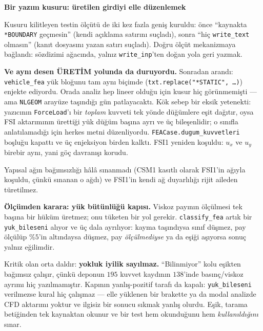 \documentclass[11pt,a4paper]{article}
\newcommand{\kkkenar}{lacivert}
\newcommand{\kkzemin}{kod}
\newenvironment{renkkutu}[3]{%
  \renewcommand{\kkkenar}{#1}\renewcommand{\kkzemin}{#2}%
  \par\medskip\noindent
  \begin{lrbox}{\kutugovde}%
  \begin{minipage}{\dimexpr\linewidth-2\fboxsep-2\fboxrule\relax}\footnotesize
  \textcolor{#1}{\textbf{#3}}\par\vspace{3pt}%
}{%
  \end{minipage}%
  \end{lrbox}%
  \noindent\fcolorbox{\kkkenar}{\kkzemin}{\usebox{\kutugovde}}%
  \par\medskip
}
\newenvironment{dikkat}[1]{\begin{renkkutu}{orta}{ortabg}{#1}}{\end{renkkutu}}
\begin{document}
\begin{description}
\begin{dikkat}{Bir yazım kusuru: üretilen girdiyi elle düzenlemek}
        Kusuru kilitleyen testin ölçütü de iki kez fazla geniş kuruldu:
        önce ``kaynakta \texttt{*BOUNDARY} geçmesin'' (kendi açıklama
        satırını suçladı), sonra ``hiç \texttt{write\_text} olmasın''
        (kanıt dosyasını yazan satırı suçladı). Doğru ölçüt mekanizmaya
        bağlandı: sözdizimi ağacında, yalnız \texttt{write\_inp}'ten doğan
        yola geri yazmak.

        \textbf{Ve aynı desen ÜRETİM yolunda da duruyordu.} Sonradan
        arandı: \texttt{vehicle\_fea} yük bloğunu tam aynı biçimde
        (\texttt{txt.replace("*STATIC", \dots)}) enjekte ediyordu. Orada
        analiz hep lineer olduğu için kusur hiç görünmemişti --- ama
        \texttt{NLGEOM} arayüze taşındığı gün patlayacaktı. Kök sebep bir
        eksik yetenekti: yazıcının \texttt{ForceLoad}'ı bir \emph{toplam}
        kuvveti tek yönde düğümlere eşit dağıtır, oysa FSI aktarımının
        ürettiği yük düğüm başına ayrı ve üç bileşenlidir; o sınıfla
        anlatılamadığı için herkes metni düzenliyordu.
        \texttt{FEACase.dugum\_kuvvetleri} boşluğu kapattı ve üç enjeksiyon
        birden kalktı. FSI1 yeniden koşuldu: $u_x$ ve $u_y$ birebir aynı,
        yani göç davranışı korudu.
        \end{dikkat}

        \noindent Yapısal ağın bağımsızlığı hâlâ sınanmadı (CSM1 kasıtlı
        olarak FSI1'in ağıyla koşuldu, çünkü sınanan o ağdı) ve FSI1'in
        kendi ağ duyarlılığı rijit aileden türetilmez.

        \medskip
        \noindent \textbf{Ölçümden karara: yük bütünlüğü kapısı.} Viskoz
        payının ölçülmesi tek başına bir hüküm üretmez; onu tüketen bir yol
        gerekir. \texttt{classify\_fea} artık bir \texttt{yuk\_bileseni}
        alıyor ve üç dala ayrılıyor: kayma taşındıysa sınıf düşmez, pay
        ölçülüp \%$5$'in altındaysa düşmez, pay \emph{ölçülmediyse} ya da
        eşiği aşıyorsa sonuç yalnız eğilimdir.

        Kritik olan orta daldır: \textbf{yokluk iyilik sayılmaz.}
        ``Bilinmiyor'' kolu eşikten bağımsız çalışır, çünkü deponun $195$
        kuvvet kaydının $138$'inde basınç/viskoz ayrımı hiç yazılmamıştır.
        Kapının yanlış-pozitif tarafı da kapalı: \texttt{yuk\_bileseni}
        verilmezse kural hiç çalışmaz --- elle yüklenen bir brakette ya da
        modal analizde CFD aktarımı yoktur ve ilgisiz bir sonucu sıkmak
        yanlış olurdu. Eşik, tarama betiğinden tek kaynaktan okunur ve bir
        test hem okunduğunu hem \emph{kullanıldığını} sınar.


\end{description}
\end{document}
